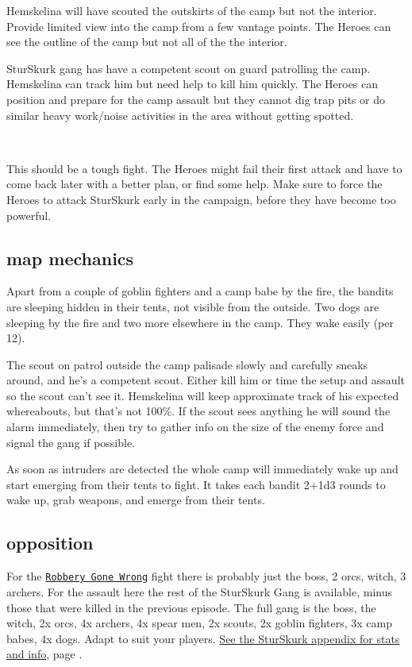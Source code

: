 Hemskelina will have scouted the outskirts of the camp but not the interior. Provide limited view into the camp from a few vantage points. The Heroes can see the outline of the camp but not all of the the interior.

SturSkurk gang has have a competent scout on guard patrolling the camp. Hemskelina can track him but need help to kill him quickly.
The Heroes can position and prepare for the camp assault but they cannot dig trap pits or do similar heavy work/noise activities in the area without getting spotted. 

\

This should be a tough fight. The Heroes might fail their first attack and have to come back later with a better plan, or find some help. Make sure to force the Heroes to attack SturSkurk early in the campaign, before they have become too powerful.


\subsection*{map mechanics}

Apart from a couple of goblin fighters and a camp babe by the fire, the bandits are sleeping hidden in their tents, not visible from the outside. Two dogs are sleeping by the fire and two more elsewhere in the camp. They wake easily (per 12).

The scout on patrol outside the camp palisade slowly and carefully sneaks around, and he's a competent scout. Either kill him or time the setup and assault so the scout can't see it. Hemskelina will keep approximate track of his expected whereabouts, but that's not 100\%. If the scout sees anything he will sound the alarm immediately, then try to gather info on the size of the enemy force and signal the gang if possible.

As soon as intruders are detected the whole camp will immediately wake up and start emerging from their tents to fight. It takes each bandit 2+1d3 rounds to wake up, grab weapons, and emerge from their tents.


\subsection*{opposition}

For the \hyperref[01robberygonewrong]{\texttt{Robbery Gone Wrong}} fight there is probably just the boss, 2 orcs, witch, 3 archers. For the assault here the rest of the SturSkurk Gang is available, minus those that were killed in the previous episode. The full gang is the boss, the witch, 2x orcs, 4x archers, 4x spear men, 2x scouts, 2x goblin fighters, 3x camp babes, 4x dogs. Adapt to suit your players. 
\hyperref[appendixsturskurk]{See the SturSkurk appendix for stats and info}, page \pageref{appendixsturskurk}.

